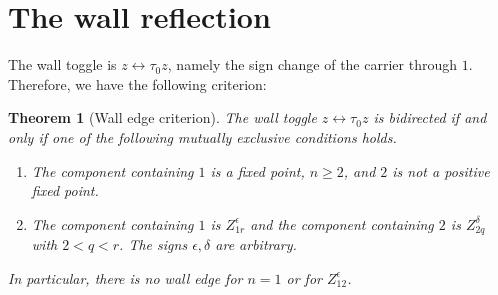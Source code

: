 \documentclass[11pt]{article}
\newtheorem{theorem}{Theorem}[section]
\theoremstyle{definition}
\theoremstyle{remark}
\begin{document}
\section{The wall reflection}
\label{sec:wall}

The wall toggle is $z\leftrightarrow\tau_0z$, namely the sign change of
the carrier through $1$.  Therefore, we have the following criterion:

\begin{theorem}[Wall edge criterion]
\label{thm:wall}
The wall toggle $z\leftrightarrow\tau_0z$ is bidirected if and only if
one of the following mutually exclusive conditions holds.
\begin{enumerate}[leftmargin=3.2em]
\item[\textup{(WF)}]
The component containing $1$ is a fixed point, $n\geq2$, and $2$ is not
a positive fixed point.
\item[\textup{(WP)}]
The component containing $1$ is $Z_{1r}^{\epsilon}$ and the component
containing $2$ is $Z_{2q}^{\delta}$ with $2<q<r$.  The signs
$\epsilon,\delta$ are arbitrary.
\end{enumerate}
In particular, there is no wall edge for $n=1$ or for $Z_{12}^{\epsilon}$.
\end{theorem}
\end{document}
